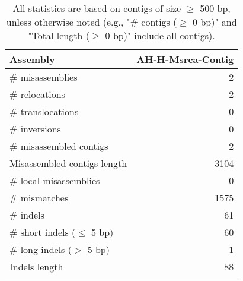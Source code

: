 \documentclass[12pt,a4paper]{article}
\begin{document}
\begin{table}[ht]
\begin{center}
\caption{All statistics are based on contigs of size $\geq$ 500 bp, unless otherwise noted (e.g., "\# contigs ($\geq$ 0 bp)" and "Total length ($\geq$ 0 bp)" include all contigs).}
\begin{tabular}{|l*{1}{|r}|}
\hline
Assembly & AH-H-Msrca-Contig \\ \hline
\# misassemblies & 2 \\ \hline
\hspace{5mm}\# relocations & 2 \\ \hline
\hspace{5mm}\# translocations & 0 \\ \hline
\hspace{5mm}\# inversions & 0 \\ \hline
\# misassembled contigs & 2 \\ \hline
Misassembled contigs length & 3104 \\ \hline
\# local misassemblies & 0 \\ \hline
\# mismatches & 1575 \\ \hline
\# indels & 61 \\ \hline
\hspace{5mm}\# short indels ($\leq$ 5 bp) & 60 \\ \hline
\hspace{5mm}\# long indels ($>$ 5 bp) & 1 \\ \hline
Indels length & 88 \\ \hline
\end{tabular}
\end{center}
\end{table}
\end{document}
